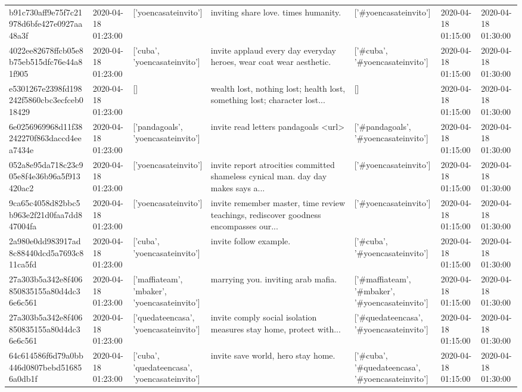 \begin{tabular}{lllllll}
b91c730aff9e75f7c21978d6bfe427e0927aa48a3f & 2020-04-18 01:23:00 & ['yoencasateinvito'] & inviting share love. times humanity. & ['#yoencasateinvito'] & 2020-04-18 01:15:00 & 2020-04-18 01:30:00 \\
4022ee82678ffcb05e8b75eb515dfc76e44a81f905 & 2020-04-18 01:23:00 & ['cuba', 'yoencasateinvito'] & invite applaud every day everyday heroes, wear coat wear aesthetic. & ['#cuba', '#yoencasateinvito'] & 2020-04-18 01:15:00 & 2020-04-18 01:30:00 \\
e5301267e2398fd198242f5860cbc3ecfceb018429 & 2020-04-18 01:23:00 & [] & wealth lost, nothing lost; health lost, something lost; character lost... & [] & 2020-04-18 01:15:00 & 2020-04-18 01:30:00 \\
6e0256969968d11f38242270f863daccd4eea7434e & 2020-04-18 01:23:00 & ['pandagoals', 'yoencasateinvito'] & invite read letters pandagoals <url> & ['#pandagoals', '#yoencasateinvito'] & 2020-04-18 01:15:00 & 2020-04-18 01:30:00 \\
052a8e95da718c23c905e8f4e36b96a5f913420ac2 & 2020-04-18 01:23:00 & ['yoencasateinvito'] & invite report atrocities committed shameless cynical man. day day makes says a... & ['#yoencasateinvito'] & 2020-04-18 01:15:00 & 2020-04-18 01:30:00 \\
9ca65c4058d82bbc5b963e2f21d0faa7dd847004fa & 2020-04-18 01:23:00 & ['yoencasateinvito'] & invite remember master, time review teachings, rediscover goodness encompasses our... & ['#yoencasateinvito'] & 2020-04-18 01:15:00 & 2020-04-18 01:30:00 \\
2a980e0dd983917ad8c88440dcd5a7693c811ca5fd & 2020-04-18 01:23:00 & ['cuba', 'yoencasateinvito'] & invite follow example. & ['#cuba', '#yoencasateinvito'] & 2020-04-18 01:15:00 & 2020-04-18 01:30:00 \\
27a303b5a342e8f406850835155a80d4dc36e6c561 & 2020-04-18 01:23:00 & ['maffiateam', 'mbaker', 'yoencasateinvito'] & marrying you. inviting arab mafia. & ['#maffiateam', '#mbaker', '#yoencasateinvito'] & 2020-04-18 01:15:00 & 2020-04-18 01:30:00 \\
27a303b5a342e8f406850835155a80d4dc36e6c561 & 2020-04-18 01:23:00 & ['quedateencasa', 'yoencasateinvito'] & invite comply social isolation measures stay home, protect with... & ['#quedateencasa', '#yoencasateinvito'] & 2020-04-18 01:15:00 & 2020-04-18 01:30:00 \\
64c614586f6d79a0bb446d0807bebd516856a0db1f & 2020-04-18 01:23:00 & ['cuba', 'quedateencasa', 'yoencasateinvito'] & invite save world, hero stay home. & ['#cuba', '#quedateencasa', '#yoencasateinvito'] & 2020-04-18 01:15:00 & 2020-04-18 01:30:00 \\

\end{tabular}
